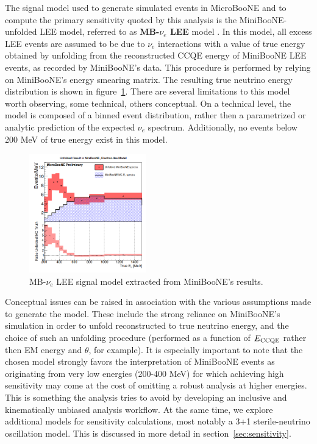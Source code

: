 \documentclass[a4paper]{article}
\begin{document}
\par  The signal model used to generate simulated events in MicroBooNE and to compute the primary sensitivity quoted by this analysis  is the MiniBooNE-unfolded LEE model, referred to as \textbf{MB-$\nu_e$ LEE} model \cite{C,C2}. In this model, all excess LEE events are assumed to be due to $\nu_e$ interactions with a value of true energy obtained by unfolding from the reconstructed CCQE energy of MiniBooNE LEE events, as recorded by MiniBooNE's data. This procedure is performed by relying on MiniBooNE's energy smearing matrix. The resulting true neutrino energy distribution is shown in figure~\ref{fig:minibooneunfolded}. There are several limitations to this model worth observing, some technical, others conceptual. On a technical level, the model is composed of a binned event distribution, rather then a parametrized or analytic prediction of the expected $\nu_e$ spectrum. Additionally, no events below 200 MeV of true energy exist in this model. 
\begin{figure}[ht]
\begin{center}
\includegraphics[width=0.45\textwidth]{introduction/unfoldedminiboone.png}
\caption{\label{fig:minibooneunfolded}MB-$\nu_e$ LEE signal model extracted from MiniBooNE's results.}
\end{center}
\end{figure}
Conceptual issues can be raised in association with the various assumptions made to generate the model. These include the strong reliance on MiniBooNE's simulation in order to unfold reconstructed to true neutrino energy, and the choice of such an unfolding procedure (performed as a function of $E_{\rm CCQE}$ rather then EM energy and $\theta$, for example).
It is especially important to note that the chosen model strongly favors the interpretation of MiniBooNE events as originating from very low energies (200-400 MeV) for which achieving high sensitivity may come at the cost of omitting a robust analysis at higher energies. This is something the analysis tries to avoid by developing an inclusive and kinematically unbiased analysis workflow. At the same time, we explore additional models for sensitivity calculations, most notably a 3+1 sterile-neutrino oscillation model. This is discussed in more detail in section~\ref{sec:sensitivity}.
\end{document}
